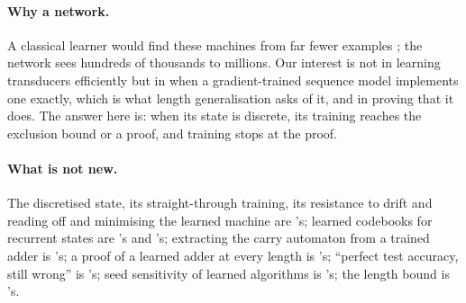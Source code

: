 \documentclass[11pt]{article}
\begin{document}
\paragraph{Why a network.} A classical learner would find these machines from far fewer examples
\citep{oncina-1992-transducer-learning-pattern-recognition}; the network sees hundreds of
thousands to millions.
Our interest is not in learning transducers efficiently but in when a gradient-trained sequence
model implements one exactly, which is what length generalisation asks of it, and in proving that
it does. The answer here is: when its state is discrete, its training reaches the exclusion bound or
a proof, and training stops at the proof.

\paragraph{What is not new.} The discretised state, its straight-through training, its resistance to
drift and reading off and minimising the learned machine are \citet{zeng-1993-self-clustering-recurrent-networks}'s;
learned codebooks for recurrent states are \citet{das-1993-unified-gradient-clustering-fsm-induction}'s
and \citet{wang-2019-state-regularized-rnns}'s; extracting the carry automaton from a trained adder
is \citet{oliva-2020-dual-recurrent-memory-processing}'s; a proof of a learned adder at every
length is \citet{lan-2022-minimum-description-length-rnns}'s; ``perfect test accuracy, still wrong''
is \citet{weiss-2018-extracting-automata-queries-counterexamples}'s; seed sensitivity of learned
algorithms is \citet{price-2016-neural-gpu-extensions-limitations}'s; the length bound is
\citet{moore-1956-gedanken-experiments-sequential-machines}'s.
\end{document}

